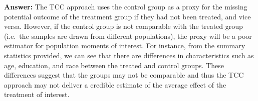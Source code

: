 \documentclass[
]{article}
\begin{document}
\begin{enumerate}
\begin{enumerate}
    \textbf{Answer:} The TCC approach uses the control group as a proxy
    for the missing potential outcome of the treatment group if they had
    not been treated, and vice versa. However, if the control group is
    not comparable with the treated group (i.e.~the samples are drawn
    from different populations), the proxy will be a poor estimator for
    population moments of interest. For instance, from the summary
    statistics provided, we can see that there are differences in
    characteristics such as age, education, and race between the treated
    and control groups. These differences suggest that the groups may
    not be comparable and thus the TCC approach may not deliver a
    credible estimate of the average effect of the treatment of
    interest.
  \end{enumerate}
\end{enumerate}

\pagebreak
\end{document}
